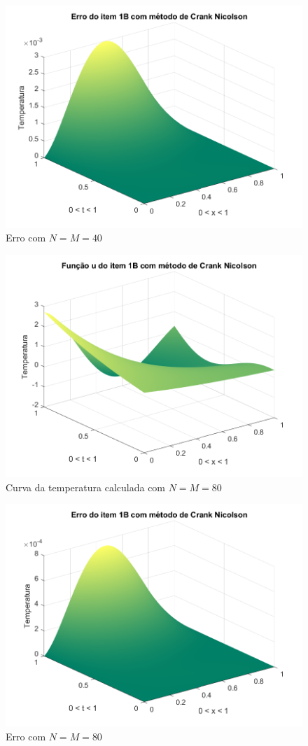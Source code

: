 \documentclass[12pt]{article}
\begin{document}
\begin{spacing}{1.5}
\begin{figure}
    \centering
    \includegraphics[width=0.8\linewidth]{Segunda_Tarefa/ItemC/nm40_erro_B.png}
    \caption{Erro com $N=M=40$}
    \label{fig:CB_nm40_erro}
\end{figure}

\begin{figure}
    \centering
    \includegraphics[width=0.8\linewidth]{Segunda_Tarefa/ItemC/nm80_calculada_B.png}
    \caption{Curva da temperatura calculada com $N=M=80$}
    \label{fig:CB_nm80_calculada}
\end{figure}

\begin{figure}
    \centering
    \includegraphics[width=0.8\linewidth]{Segunda_Tarefa/ItemC/nm80_erro_B.png}
    \caption{Erro com $N=M=80$}
    \label{fig:CB_nm80_erro}
\end{figure}


\end{spacing}
\end{document}
